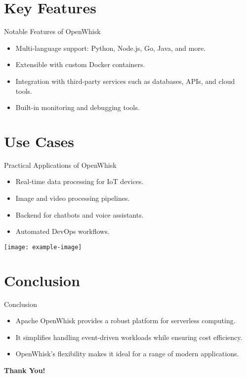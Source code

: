 \documentclass[aspectratio=169]{beamer}
\begin{document}
\section{Key Features}

\begin{frame}{Notable Features of OpenWhisk}
    \begin{itemize}
        \item Multi-language support: Python, Node.js, Go, Java, and more.
        \item Extensible with custom Docker containers.
        \item Integration with third-party services such as databases, APIs, and cloud tools.
        \item Built-in monitoring and debugging tools.
    \end{itemize}
\end{frame}

\section{Use Cases}

\begin{frame}{Practical Applications of OpenWhisk}
    \begin{itemize}
        \item Real-time data processing for IoT devices.
        \item Image and video processing pipelines.
        \item Backend for chatbots and voice assistants.
        \item Automated DevOps workflows.
    \end{itemize}
    \centering
    \texttt{[image: example-image]} %
\end{frame}

\section{Conclusion}

\begin{frame}{Conclusion}
    \begin{itemize}
        \item Apache OpenWhisk provides a robust platform for serverless computing.
        \item It simplifies handling event-driven workloads while ensuring cost efficiency.
        \item OpenWhisk’s flexibility makes it ideal for a range of modern applications.
    \end{itemize}
    \centering
    \textbf{Thank You!}
\end{frame}
\end{document}
